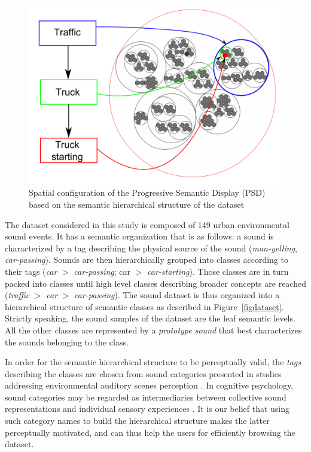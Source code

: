 \documentclass{aes2e}
\begin{document}
\begin{figure}[t]
\begin{center}
\includegraphics[scale=0.24]{gfx/SSF.pdf} 
\end{center}
\caption{\label{figSSF} Spatial configuration of the Progressive Semantic Display (PSD) based on the semantic hierarchical structure of the dataset}
\end{figure}


The dataset considered in this study is composed of 149 urban environmental sound events. It has a semantic organization that is as follows: a sound is characterized by a tag describing the physical source of the sound (\textit{man-yelling}, \textit{car-passing}). Sounds are then hierarchically grouped into classes according to their tags (\textit{car} $>$ \textit{car-passing}; car $>$ \textit{car-starting}). Those classes are in turn  packed into classes until high level classes describing broader concepts are reached (\textit{traffic} $>$ \textit{car} $>$ \textit{car-passing}). The sound dataset is thus organized into a hierarchical structure of semantic classes as described in Figure~\ref{figdataset}. Strictly speaking, the sound samples of the dataset are the leaf semantic levels. All the other classes are represented by a \textit{prototype sound} that best characterizes the sounds belonging to the class. 

In order for the semantic hierarchical structure to be perceptually valid, the \textit{tags} describing the classes  are chosen from sound categories presented in studies addressing environmental auditory scenes perception \cite{niessen2010categories, brown2011towards, dubois2006cognitive}. In cognitive psychology, sound categories may be regarded as intermediaries between collective sound representations and individual sensory experiences \cite{dubois2006cognitive}. It is our belief that using such category names to build the hierarchical structure makes the latter perceptually motivated, and can thus help the users for efficiently browsing the dataset.
\end{document}
